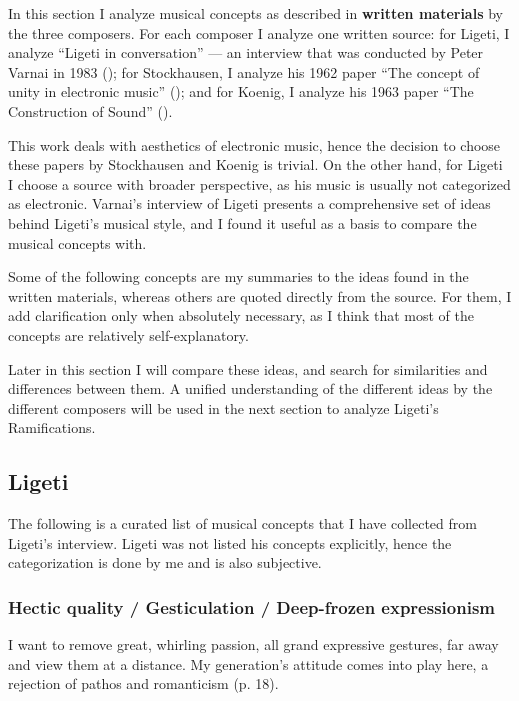 \documentclass[a4paper,11pt]{article}
\newenvironment{MyShadequote}[1][]{%
    \ignorespaces%
    \begin{mdframed}[style=MyShadeQuoteStyle,#1]%
}{%
    \end{mdframed}%
    \ignorespacesafterend%
}%
\begin{document}
In this section I analyze musical concepts as described in \textbf{written materials} by the three composers.
For each composer I analyze one written source:
for Ligeti, I analyze ``Ligeti in conversation'' --- an interview that was conducted by Peter Varnai in 1983 (\citeauthor{varnai});
for Stockhausen, I analyze his 1962 paper ``The concept of unity in electronic music'' (\citeauthor{stockhausen});
and for Koenig, I analyze his 1963 paper ``The Construction of Sound'' (\citeauthor{koenig}).

This work deals with aesthetics of electronic music, hence the decision to choose these papers by Stockhausen and Koenig is trivial.
On the other hand, for Ligeti I choose a source with broader perspective, as his music is usually not categorized as electronic.
Varnai's interview of Ligeti presents a comprehensive set of ideas behind Ligeti's musical style, and I found it useful as a basis to compare the musical concepts with.

Some of the following concepts are my summaries to the ideas found in the written materials, whereas others are quoted directly from the source.
For them, I add clarification only when absolutely necessary, as I think that most of the concepts are relatively self-explanatory.

Later in this section I will compare these ideas, and search for similarities and differences between them.
A unified understanding of the different ideas by the different composers will be used in the next section to analyze Ligeti's Ramifications.

\subsection{Ligeti}
\label{sub:eshtetic_ligeti}

The following is a curated list of musical concepts that I have collected from Ligeti's interview.
Ligeti was not listed his concepts explicitly, hence the categorization is done by me and is also subjective.

\subsubsection{Hectic quality / Gesticulation / Deep-frozen expressionism}
\label{subs:ligeti:hectic}

\begin{MyShadequote}
  I want to remove great, whirling passion, all grand expressive gestures, far away and view them at a distance.
  My generation's attitude comes into play here, a rejection of pathos and romanticism (p. 18).
\end{MyShadequote}
\end{document}
